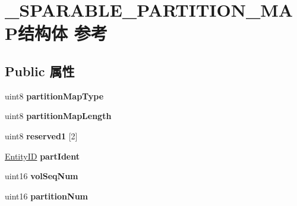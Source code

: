 \hypertarget{struct___s_p_a_r_a_b_l_e___p_a_r_t_i_t_i_o_n___m_a_p}{}\section{\+\_\+\+S\+P\+A\+R\+A\+B\+L\+E\+\_\+\+P\+A\+R\+T\+I\+T\+I\+O\+N\+\_\+\+M\+A\+P结构体 参考}
\label{struct___s_p_a_r_a_b_l_e___p_a_r_t_i_t_i_o_n___m_a_p}
\subsection*{Public 属性}
\begin{DoxyCompactItemize}
\item 
\mbox{\label{struct___s_p_a_r_a_b_l_e___p_a_r_t_i_t_i_o_n___m_a_p_abd9eb2e90e7b28ccf3ab3a19c8d9cee9}} 
uint8 {\bfseries partition\+Map\+Type}
\item 
\mbox{\label{struct___s_p_a_r_a_b_l_e___p_a_r_t_i_t_i_o_n___m_a_p_a98825a1ecfa80ea5d852036615b7792d}} 
uint8 {\bfseries partition\+Map\+Length}
\item 
\mbox{\label{struct___s_p_a_r_a_b_l_e___p_a_r_t_i_t_i_o_n___m_a_p_a97c88b4668585e6aebb5a214e45fcd8f}} 
uint8 {\bfseries reserved1} \mbox{[}2\mbox{]}
\item 
\mbox{\label{struct___s_p_a_r_a_b_l_e___p_a_r_t_i_t_i_o_n___m_a_p_ae61ced2729da5c0898534d4e9abcaecd}} 
\hyperlink{struct_entity_i_d}{Entity\+ID} {\bfseries part\+Ident}
\item 
\mbox{\label{struct___s_p_a_r_a_b_l_e___p_a_r_t_i_t_i_o_n___m_a_p_a21a14aedb944f9c5b03df9a81dc57083}} 
uint16 {\bfseries vol\+Seq\+Num}
\item 
\mbox{\label{struct___s_p_a_r_a_b_l_e___p_a_r_t_i_t_i_o_n___m_a_p_a8df138acb7e12f9c36a37d1a3d72b07b}} 
uint16 {\bfseries partition\+Num}
\item 

\end{DoxyCompactItemize}

